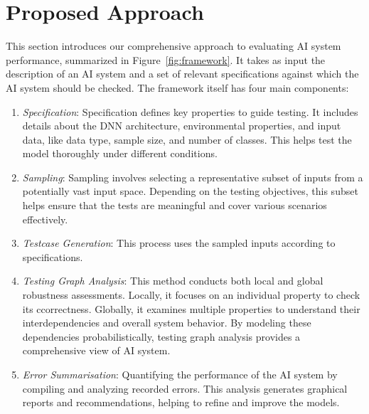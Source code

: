 
\section{Proposed Approach}

This section introduces our comprehensive approach to evaluating AI system performance, summarized in Figure~\ref{fig:framework}. It takes as input the description of an AI system and a set of relevant specifications against which the AI system should be checked. The framework itself has four main components:

\begin{enumerate}
  \item \emph{Specification}: Specification defines key properties to guide testing. It includes details about the DNN architecture, environmental properties, and input data, like data type, sample size, and number of classes. This helps test the model thoroughly under different conditions.
    \item \emph{Sampling}: Sampling involves selecting a representative subset of inputs from a potentially vast input space. Depending on the testing objectives, this subset helps ensure that the tests are meaningful and cover various scenarios effectively.
    \item \emph{Testcase Generation}: This process uses the sampled inputs according to specifications.
    \item \emph{Testing Graph Analysis}: This method conducts both local and global robustness assessments. Locally, it focuses on an individual property to check its ccorrectness. Globally, it examines multiple properties to understand their interdependencies and overall system behavior. By modeling these dependencies probabilistically, testing graph analysis provides a comprehensive view of AI system.
    \item \emph{Error Summarisation}: Quantifying the performance of the AI system by compiling and analyzing recorded errors. This analysis generates graphical reports and recommendations, helping to refine and improve the models.
\end{enumerate}

